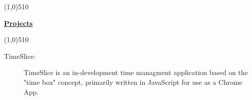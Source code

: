 \documentclass[letterpaper,11pt]{article}
\newcommand{\resheading}[1]{{\large {\begin{minipage}{\textwidth}{\textbf{#1 \vphantom{p\^{E}}}}\end{minipage}}}}
\begin{document}
\begin{description}
	\end{description} %

\line(1,0){510}

\resheading{\href{https://github.com/nicholaslgoodman}{Projects}}

\line(1,0){510}

\begin{description}
\item[TimeSlice:] { \footnotesize TimeSlice is an in-development time managment application based on the "time box" concept, primarily written in JavaScript for use as a Chrome App.}

\end{description}
\end{document}

